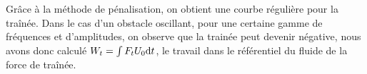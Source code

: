 		Grâce à la méthode de pénalisation, on obtient une courbe régulière pour la traînée. Dans le cas d'un obstacle oscillant, pour une certaine gamme de fréquences et d'amplitudes, on observe que la trainée peut devenir négative, nous avons donc calculé $W_t= \int F_t U_0\mathrm{d}t$, le travail dans le référentiel du fluide de la force de traînée.

	
	
	
		


	
